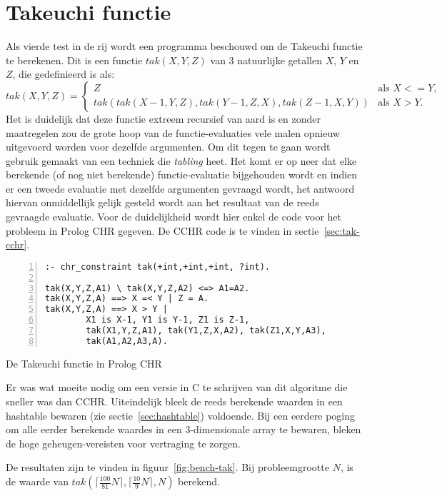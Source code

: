 \section{Takeuchi functie} \label{sec:bench-tak}

Als vierde test in de rij wordt een programma beschouwd om de Takeuchi functie te berekenen. Dit is een functie $tak(X,Y,Z)$ van 3 natuurlijke getallen $X$, $Y$ en $Z$, die gedefinieerd is als:
\begin{equation*}
tak(X,Y,Z) = 
\begin{cases} 
  Z & \text{als $X <= Y$,} \\
  tak(tak(X-1,Y,Z),tak(Y-1,Z,X),tak(Z-1,X,Y)) & \text{als $X > Y$.}
\end{cases}
\end{equation*}
Het is duidelijk dat deze functie extreem recursief van aard is en zonder maatregelen zou de grote hoop van de functie-evaluaties vele malen opnieuw uitgevoerd worden voor dezelfde argumenten. Om dit tegen te gaan wordt gebruik gemaakt van een techniek die {\em tabling} heet. Het komt er op neer dat elke berekende (of nog niet berekende) functie-evaluatie bijgehouden wordt en indien er een tweede evaluatie met dezelfde argumenten gevraagd wordt, het antwoord hiervan onmiddellijk gelijk gesteld wordt aan het resultaat van de reeds gevraagde evaluatie. Voor de duidelijkheid wordt hier enkel de code voor het probleem in Prolog CHR gegeven. De CCHR code is te vinden in sectie~\ref{sec:tak-cchr}.
\begin{exCode}
\begin{Verbatim}[frame=single,numbers=left]
:- chr_constraint tak(+int,+int,+int, ?int).

tak(X,Y,Z,A1) \ tak(X,Y,Z,A2) <=> A1=A2.
tak(X,Y,Z,A) ==> X =< Y | Z = A.
tak(X,Y,Z,A) ==> X > Y | 
        X1 is X-1, Y1 is Y-1, Z1 is Z-1,
        tak(X1,Y,Z,A1), tak(Y1,Z,X,A2), tak(Z1,X,Y,A3),
        tak(A1,A2,A3,A).
\end{Verbatim}
\caption{\label{code:tak} De Takeuchi functie in Prolog CHR}
\end{exCode}
Er was wat moeite nodig om een versie in C te schrijven van dit algoritme die sneller was dan CCHR. Uiteindelijk bleek de reeds berekende waarden in een hashtable bewaren (zie sectie~\ref{sec:hashtable}) voldoende. Bij een eerdere poging om alle eerder berekende waardes in een 3-dimensionale array te bewaren, bleken de hoge geheugen-vereisten voor vertraging te zorgen.

De resultaten zijn te vinden in figuur~\ref{fig:bench-tak}. Bij probleemgrootte $N$, is de waarde van $tak(\lceil\frac{100}{81}N\rceil,\lceil\frac{10}{9}N\rceil,N)$ berekend.

